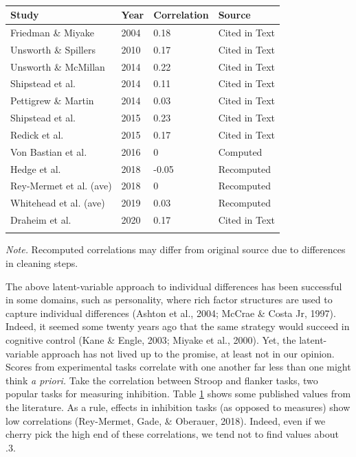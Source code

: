 \documentclass[
  english,
  ,man]{apa6}
\begin{document}
\begin{table}[tbp]

\begin{center}
\begin{threeparttable}

\caption{\label{tab:corTab}}

\begin{tabular}{llll}
\toprule
Study & Year & Correlation & Source\\
\midrule
Friedman \& Miyake & 2004 & 0.18 & Cited in Text\\
Unsworth \& Spillers & 2010 & 0.17 & Cited in Text\\
Unsworth \& McMillan & 2014 & 0.22 & Cited in Text\\
Shipstead et al. & 2014 & 0.11 & Cited in Text\\
Pettigrew \& Martin & 2014 & 0.03 & Cited in Text\\
Shipstead et al. & 2015 & 0.23 & Cited in Text\\
Redick et al. & 2015 & 0.17 & Cited in Text\\
Von Bastian et al. & 2016 & 0 & Computed\\
Hedge et al. & 2018 & -0.05 & Recomputed\\
Rey-Mermet et al. (ave) & 2018 & 0 & Recomputed\\
Whitehead et al. (ave) & 2019 & 0.03 & Recomputed\\
Draheim et al. & 2020 & 0.17 & Cited in Text\\
\bottomrule
\addlinespace
\end{tabular}

\begin{tablenotes}[para]
\normalsize{\textit{Note.} Recomputed correlations may differ from original source due to differences in cleaning steps.}
\end{tablenotes}

\end{threeparttable}
\end{center}

\end{table}

The above latent-variable approach to individual differences has been successful in some domains, such as personality, where rich factor structures are used to capture individual differences (Ashton et al., 2004; McCrae \& Costa Jr, 1997). Indeed, it seemed some twenty years ago that the same strategy would succeed in cognitive control (Kane \& Engle, 2003; Miyake et al., 2000). Yet, the latent-variable approach has not lived up to the promise, at least not in our opinion. Scores from experimental tasks correlate with one another far less than one might think \emph{a priori.} Take the correlation between Stroop and flanker tasks, two popular tasks for measuring inhibition. Table \ref{tab:corTab} shows some published values from the literature. As a rule, effects in inhibition tasks (as opposed to measures) show low correlations (Rey-Mermet, Gade, \& Oberauer, 2018). Indeed, even if we cherry pick the high end of these correlations, we tend not to find values about .3.
\end{document}
